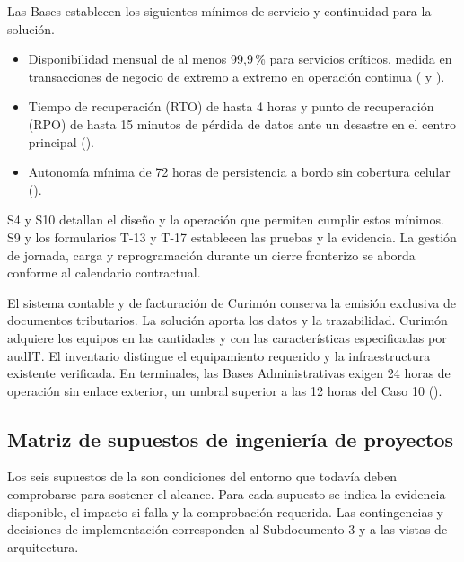 Las Bases establecen los siguientes mínimos de servicio y continuidad para la solución.

\begin{itemize}
  \item Disponibilidad mensual de al menos 99,9\,\% para servicios críticos, medida en transacciones de negocio de extremo a extremo en operación continua ( y ).
  \item Tiempo de recuperación (RTO) de hasta 4 horas y punto de recuperación (RPO) de hasta 15 minutos de pérdida de datos ante un desastre en el centro principal ().
  \item Autonomía mínima de 72 horas de persistencia a bordo sin cobertura celular ().
\end{itemize}

S4 y S10 detallan el diseño y la operación que permiten cumplir estos mínimos. S9 y los formularios T-13 y T-17 establecen las pruebas y la evidencia. La gestión de jornada, carga y reprogramación durante un cierre fronterizo se aborda conforme al calendario contractual.

El sistema contable y de facturación de Curimón conserva la emisión exclusiva de documentos tributarios. La solución aporta los datos y la trazabilidad. Curimón adquiere los equipos en las cantidades y con las características especificadas por audIT. El inventario distingue el equipamiento requerido y la infraestructura existente verificada. En terminales, las Bases Administrativas exigen 24 horas de operación sin enlace exterior, un umbral superior a las 12 horas del Caso 10 ().

\subsection{Matriz de supuestos de ingeniería de proyectos}\label{sec:2-supuestos-matriz}

Los seis supuestos de la  son condiciones del entorno que todavía deben comprobarse para sostener el alcance. Para cada supuesto se indica la evidencia disponible, el impacto si falla y la comprobación requerida. Las contingencias y decisiones de implementación corresponden al Subdocumento 3 y a las vistas de arquitectura.

